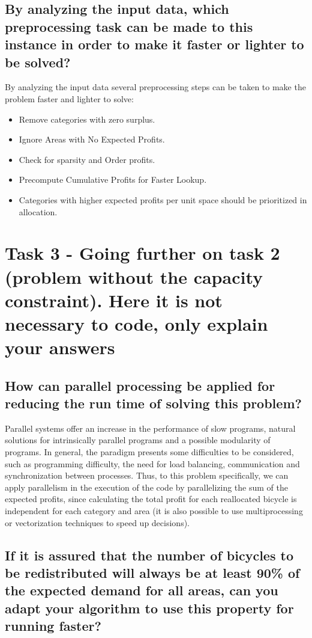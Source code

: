 \documentclass{article}
\begin{document}
	
	\subsection{By analyzing the input data, which preprocessing task can be made to this instance in order to make it faster or lighter to be solved? }
	
	By analyzing the input data several preprocessing steps can be taken to make the problem faster and lighter to solve:
	
	
	\begin{itemize}
		\item Remove categories with zero surplus.
		\item Ignore Areas with No Expected Profits.
		\item Check for sparsity and Order profits.
		\item Precompute Cumulative Profits for Faster Lookup.
		\item Categories with higher expected profits per unit space should be prioritized in allocation.
	\end{itemize}
	
	
	\section{Task 3 - Going further on task 2 (problem without the capacity constraint). Here it is not necessary to code, only explain your answers }
	
	\subsection{How can parallel processing be applied for reducing the run time of solving this problem?}
	
	Parallel systems offer an increase in the performance of slow programs, natural solutions for intrinsically parallel programs and a possible modularity of programs. In general, the paradigm presents some difficulties to be considered, such as programming difficulty, the need for load balancing, communication and synchronization between processes.
	Thus, to this problem specifically, we can apply parallelism in the execution of the code by parallelizing the sum of the expected profits, since calculating the total profit for each reallocated bicycle is independent for each category and area (it is also possible to use multiprocessing or vectorization techniques to speed up decisions).
	
	\subsection{If it is assured that the number of bicycles to be redistributed will always be at least 90\% of the expected demand for all areas, can you adapt your algorithm to use this property for running faster?}
	
\end{document}
